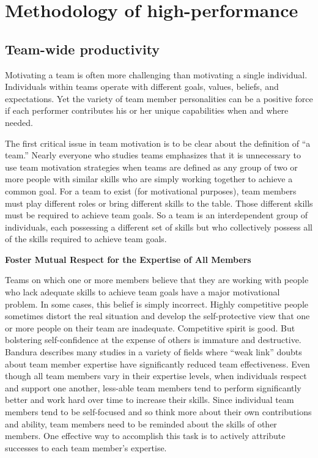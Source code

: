 \chapter{Methodology of high-performance}
\label{chap:building}

\section{Team-wide productivity}

Motivating a team is often more challenging than motivating a single individual. Individuals within teams operate with different goals, values, beliefs, and expectations. Yet the variety of team member personalities can be a positive force if each performer contributes his or her unique capabilities when and where needed.

The first critical issue in team motivation is to be clear about the definition of ``a team.'' Nearly everyone who studies teams emphasizes that it is unnecessary to use team motivation strategies when teams are defined as any group of two or more people with similar skills who are simply working together to achieve a common goal. For a team to exist (for motivational purposes), team members must play different roles or bring different skills to the table. Those different skills must be required to achieve team goals. So a team is an interdependent group of individuals, each possessing a different set of skills but who collectively possess all of the skills required to achieve team goals.

\textbf{Foster Mutual Respect for the Expertise of All Members}

Teams on which one or more members believe that they are working with people who lack adequate skills to achieve team goals have a major motivational problem. In some cases, this belief is simply incorrect. Highly competitive people sometimes distort the real situation and develop the self-protective view that one or more people on their team are inadequate. Competitive spirit is good. But bolstering self-confidence at the expense of others is immature and destructive. Bandura describes many studies in a variety of fields where ``weak link'' doubts about team member expertise have significantly reduced team effectiveness. Even though all team members vary in their expertise levels, when individuals respect and support one another, less-able team members tend to perform significantly better and work hard over time to increase their skills. Since individual team members tend to be self-focused and so think more about their own contributions and ability, team members need to be reminded about the skills of other members. One effective way to accomplish this task is to actively attribute successes to each team member’s expertise.

